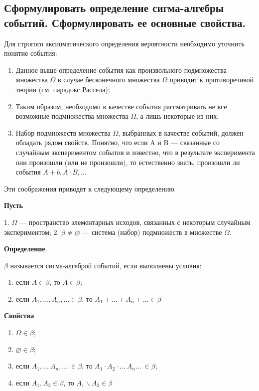 \subsection{Сформулировать определение сигма-алгебры событий. Сформулировать ее основные свойства.}

Для строгого аксиоматического определения вероятности необходимо уточнить понятие события:

\begin{enumerate}
	\item Данное выше определение события как произвольного подмножества множества $\Omega$ в случае бесконечного множества $\Omega$ приводит к противоречивой теории (см. парадокс Рассела);
	\item Таким образом, необходимо в качестве события рассматривать не все возможные подмножества множества $\Omega$, а лишь некоторые из них; 
	\item Набор подмножеств множества $\Omega$, выбранных в качестве событий, должен обладать рядом свойств. Понятно, что если A и B --- связанные со случайным экспериментом события и известно, что в результате эксперимента они произошли (или не произошли), то естественно знать, произошли ли события $A + b, A \cdot B, \dots$
\end{enumerate}

Эти соображения приводят к следующему определению.

\textbf{Пусть} 

1. $\Omega$ --- пространство элементарных исходов, связанных с некоторым случайным экспериментом; 
2. $\beta \neq \varnothing$ --- система (набор) подмножеств в множестве $\Omega$.

\textbf{Определение}. 

$\beta$ называется сигма-алгеброй событий, если выполнены условия: 
\begin{enumerate}
	\item если $A \in \beta$, то $\overline{A} \in \beta$;
	\item если $A_1, \dots, A_n, \dots \in \beta$, то $A_1 + \dots + A_n + \dots \in \beta$
\end{enumerate}

\textbf{Свойства}

\begin{enumerate}
	
	\item $\Omega \in \beta$;
	\item $\varnothing \in \beta$;
	\item если $A_1, \dots\ A_n, \dots\ \in \beta$, то $A_1 \cdot A_2 \cdot \dots\ A_n \dots\ \in \beta$;
	\item если $A_1, A_2 \in \beta$, то $A_1 \backslash A_2 \in \beta$
\end{enumerate}


